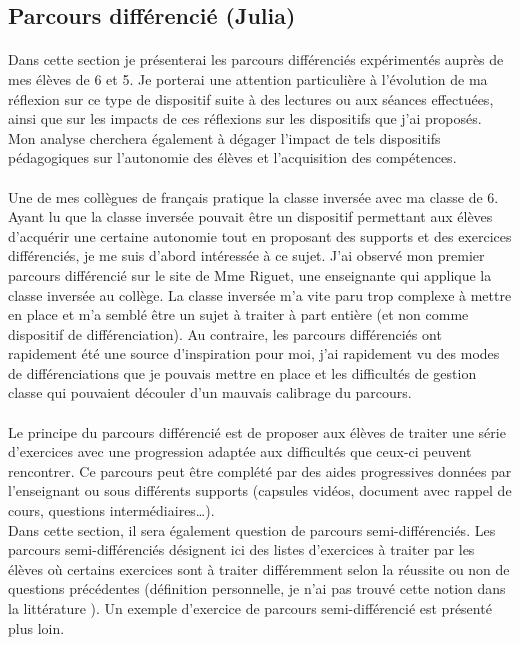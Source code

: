 \subsection{Parcours différencié (Julia)}
\paragraph{} Dans cette section je présenterai les parcours différenciés expérimentés auprès de mes élèves de 6 et 5. Je porterai une attention particulière à l'évolution de ma réflexion sur ce type de dispositif suite à des lectures ou aux séances effectuées, ainsi que sur les impacts de ces réflexions sur les dispositifs que j'ai proposés. Mon analyse cherchera également à dégager l'impact de tels dispositifs pédagogiques sur l'autonomie des élèves et l'acquisition des compétences.
\paragraph{}Une de mes collègues de français pratique la classe inversée avec ma classe de 6. Ayant lu que la classe inversée\cite{cnesco_Lafontaine}\cite{cnesco_notes_experts} pouvait être un dispositif permettant aux élèves d'acquérir une certaine autonomie tout en proposant des supports et des exercices différenciés, je me suis d'abord intéressée à ce sujet. J'ai observé mon premier parcours différencié sur le site de Mme Riguet\cite{Riguet}, une enseignante qui applique la classe inversée au collège. La classe inversée m'a vite paru trop complexe à mettre en place et m'a semblé être un sujet à traiter à part entière (et non comme dispositif de différenciation). Au contraire, les parcours différenciés ont rapidement été une source d'inspiration pour moi, j'ai rapidement vu des modes de différenciations que je pouvais mettre en place et les difficultés de gestion classe qui pouvaient découler d'un mauvais calibrage du parcours.
\paragraph{}Le principe du parcours différencié est de proposer aux élèves de traiter une série d'exercices avec une progression adaptée aux difficultés que ceux-ci peuvent rencontrer. Ce parcours peut être complété par des aides progressives données par l'enseignant ou sous différents supports (capsules vidéos, document avec rappel de cours, questions intermédiaires\ldots ). \\
Dans cette section, il sera également question de parcours semi-différenciés. Les parcours semi-différenciés désignent ici des listes d'exercices à traiter par les élèves où certains exercices sont à traiter différemment selon la réussite ou non de questions précédentes (définition personnelle, je n'ai pas trouvé cette notion dans la littérature ). Un exemple d'exercice de parcours semi-différencié est présenté plus loin.
